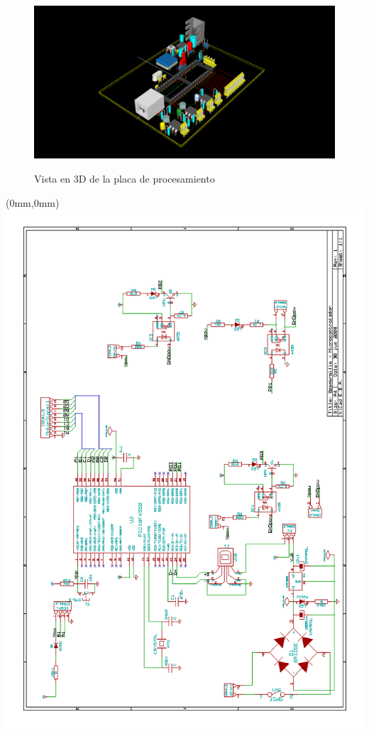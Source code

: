 \begin{figure}[hb]
  \centering
  \includegraphics[width=14cm]{./img/pic_board_3d_2.png}
  \label{fig:pic_board_3d_2}
  \caption{Vista en 3D de la placa de procesamiento}
\end{figure}





\begin{textblock*}{297mm}(0mm,0mm)
   \includegraphics[width=\paperwidth]{./img/pic_board.png}
   \label{cap:pic_board}
\end{textblock*}

\cleardoublepage

